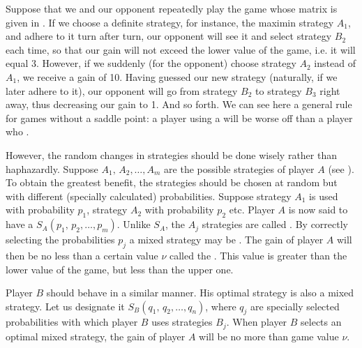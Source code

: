  Suppose that we and our opponent repeatedly play the
game whose matrix is given in . If we choose a definite strategy, for instance, the maximin strategy $A_{1}$, and adhere to it turn after turn, our opponent will see it and select strategy $B_{2}$ each time, so that our
gain will not exceed the lower value of the game, i.e. it will equal 3.
However, if we suddenly (for the opponent) choose strategy $A_{2}$ instead
of $A_{1}$, we receive a gain of 10. Having guessed our new strategy
(naturally, if we later adhere to it), our opponent will go from strategy
$B_{2}$ to strategy $B_{3}$ right away, thus decreasing our gain to 1. And so
forth. We can see here a general rule for games without a saddle point:
a player using a  will be worse off than a player who
.

However, the random changes in strategies should be done wisely
rather than haphazardly. Suppose $A_{1}, \, A_{2}, \ldots, A_{m}$ are the possible
strategies of player $A$ (see ). To obtain the greatest benefit, the strategies should be chosen at random but with different (specially
calculated) probabilities. Suppose strategy $A_{1}$ is used with probability
$p_{1}$, strategy $A_{2}$ with probability $p_{2}$ etc. Player $A$ is now said to have a  $S_{A} (p_{1}, \, p_{2}, \ldots{}, p_{m})$. Unlike $S_{A}$, the $A_{j}$ strategies are called . By correctly selecting the probabilities $p_{j}$ a mixed strategy may be . The gain of player $A$ will then be no less than a certain value $\nu$ called the . This value is greater than the lower value of the game, but less than the upper one.

Player $B$ should behave in a similar manner. His optimal strategy is
also a mixed strategy. Let us designate it  $S_{B} (q_{1}, \, q_{2}, \ldots{}, q_{n})$, where $q_{j}$ are specially selected probabilities with which player $B$ uses strategies $B_{j}$. When player $B$ selects an optimal mixed strategy, the gain of player $A$ will be no more than game value $\nu$.

